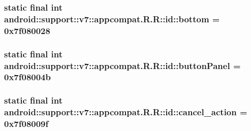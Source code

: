 \hypertarget{classandroid_1_1support_1_1v7_1_1appcompat_1_1_r_1_1id_79aaf32852de0fa22a8b09eeedf0914f}{
\subsubsection[{bottom}]{\setlength{\rightskip}{0pt plus 5cm}static final int android::support::v7::appcompat.R.R::id::bottom = 0x7f080028}}
\label{classandroid_1_1support_1_1v7_1_1appcompat_1_1_r_1_1id_79aaf32852de0fa22a8b09eeedf0914f}


\hypertarget{classandroid_1_1support_1_1v7_1_1appcompat_1_1_r_1_1id_51cd6540399bcb5141c0fec89f6e7d79}{
\subsubsection[{buttonPanel}]{\setlength{\rightskip}{0pt plus 5cm}static final int android::support::v7::appcompat.R.R::id::buttonPanel = 0x7f08004b}}
\label{classandroid_1_1support_1_1v7_1_1appcompat_1_1_r_1_1id_51cd6540399bcb5141c0fec89f6e7d79}


\hypertarget{classandroid_1_1support_1_1v7_1_1appcompat_1_1_r_1_1id_707c5ba7d9de2c097007a45bbbaf2338}{
\subsubsection[{cancel\_\-action}]{\setlength{\rightskip}{0pt plus 5cm}static final int android::support::v7::appcompat.R.R::id::cancel\_\-action = 0x7f08009f}}
\label{classandroid_1_1support_1_1v7_1_1appcompat_1_1_r_1_1id_707c5ba7d9de2c097007a45bbbaf2338}


